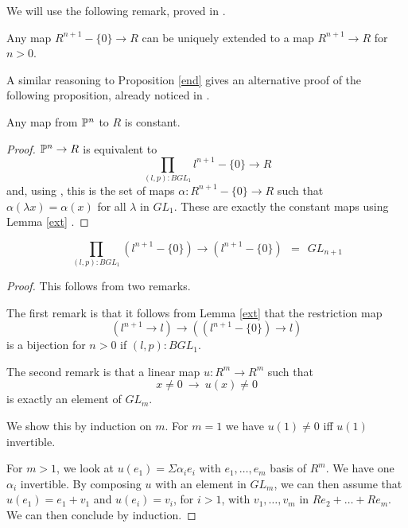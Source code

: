 We will use the following remark, proved in \cite{draft}.

\begin{lemma}\label{ext}
  Any map $R^{n+1}-\{0\}\rightarrow R$ can be uniquely extended to a map $R^{n+1}\rightarrow R$ for $n>0$.
\end{lemma}

A similar reasoning to Proposition \ref{end} gives an alternative proof of the following proposition, already noticed in \cite{draft}.

\begin{proposition}\label{const}
 Any map from $\mathbb{P}^n$ to $R$ is constant.
\end{proposition}

\begin{proof}
  $\mathbb{P}^n\rightarrow R$ is equivalent to
  $$\prod_{(l,p):BGL_1}l^{n+1}-\{0\}\rightarrow R$$
  and, using \cite{Sym}, this is the set of maps $\alpha:R^{n+1}-\{0\}\rightarrow R$
  such that $\alpha(\lambda x) = \alpha(x)$ for all $\lambda$ in $GL_1$. These are exactly the constant maps
  using Lemma \ref{ext} \cite{draft}.
\end{proof}

\begin{proposition}\label{aut}
$$\prod_{(l,p):BGL_1}(l^{n+1}-\{0\})\rightarrow (l^{n+1}-\{0\}) ~~=~~ GL_{n+1}$$
\end{proposition}

\begin{proof}
  This follows from two remarks.

  The first remark is that it follows from Lemma \ref{ext} that the restriction map
$$
(l^{n+1}\rightarrow l)\rightarrow ((l^{n+1}-\{0\})\rightarrow l)
$$
is a bijection for $n>0$ if $(l,p):BGL_1$.

\medskip

The second remark is that a linear map $u:R^{m}\rightarrow R^{m}$ such that
$$
x\neq 0~\rightarrow~u(x)\neq 0
$$
is exactly an element of $GL_{m}$.

We show this by induction on $m$. For $m=1$ we have $u(1)\neq 0$ iff $u(1)$ invertible.

For $m>1$, we look at $u(e_1) = \Sigma \alpha_ie_i$ with $e_1,\dots,e_m$ basis of $R^m$.
We have one $\alpha_i$ invertible. By composing $u$ with an element in $GL_m$, we can then
assume that $u(e_1) = e_1+v_1$ and $u(e_i) = v_i$, for $i>1$, with $v_1,\dots,v_m$ in $Re_2+\dots+Re_m$.
We can then conclude by induction.
\end{proof}


